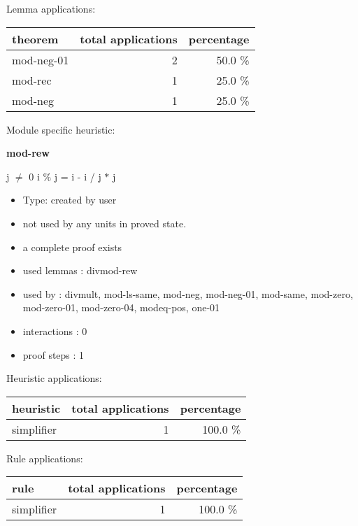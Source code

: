 \documentclass[a4paper]{article}
\begin{document}
Lemma applications:

\begin{supertabular}{l|r|r}
theorem	        & total applications & percentage \\ \hline
mod-neg-01 & 2 & 50.0 \% \\
mod-rec & 1 & 25.0 \% \\
mod-neg & 1 & 25.0 \% \\

\end{supertabular}

Module specific heuristic:

\pagebreak

{\LARGE\bf mod-rew}\label{lemma-mod-rew}

\medskip

j $\neq$ 0 \Fol i \% j = i - i / j $*$ j

\begin{itemize}

\item Type: created by user

\item not used by any units in proved state.
\item       a complete proof exists
\item       used lemmas  : divmod-rew
\item       used by      : divmult, mod-ls-same, mod-neg, mod-neg-01, mod-same, mod-zero, mod-zero-01, mod-zero-04, modeq-pos, one-01
\item       interactions : 0
\item       proof steps  : 1
\end{itemize}

\medskip


Heuristic applications:

\begin{supertabular}{l|r|r}
heuristic	& total applications & percentage \\ \hline
simplifier & 1 & 100.0 \% \\

\end{supertabular}

Rule applications:

\begin{supertabular}{l|r|r}
rule	        & total applications & percentage \\ \hline
simplifier & 1 & 100.0 \% \\

\end{supertabular}
\end{document}
